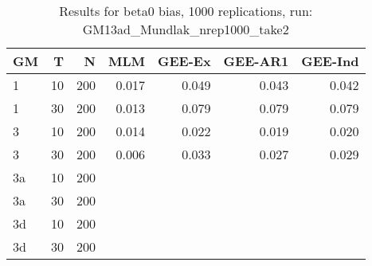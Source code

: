 \begin{table}[ht]
\centering
\begin{tabular}{lrrrrrr}
  \hline
GM & T & N & MLM & GEE-Ex & GEE-AR1 & GEE-Ind \\ 
  \hline
1 & 10 & 200 & 0.017 & 0.049 & 0.043 & 0.042 \\ 
  1 & 30 & 200 & 0.013 & 0.079 & 0.079 & 0.079 \\ 
  3 & 10 & 200 & 0.014 & 0.022 & 0.019 & 0.020 \\ 
  3 & 30 & 200 & 0.006 & 0.033 & 0.027 & 0.029 \\ 
  3a & 10 & 200 &  &  &  &  \\ 
  3a & 30 & 200 &  &  &  &  \\ 
  3d & 10 & 200 &  &  &  &  \\ 
  3d & 30 & 200 &  &  &  &  \\ 
   \hline
\end{tabular}
\caption{Results for beta0 bias, 1000 replications, run: GM13ad_Mundlak_nrep1000_take2} 
\label{tab:beta0_bias}
\end{table}

